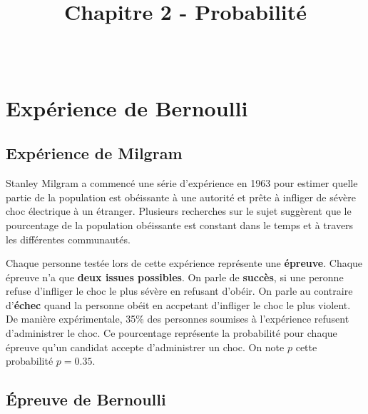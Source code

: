 \documentclass[paper=a4, fontsize=9pt]{scrartcl} %
\title{	
  \vspace{-10ex}
  \horrule{0.5pt} \\[0.4cm] %
  \huge Chapitre 2 - Probabilité\\ %
  \horrule{2pt} \\[0.5cm] %
}
\author{}
\date{\vspace{-10ex}} %
\begin{document}

\newtheorem{Definition}{Définition}
\newtheorem{Theorem}{Théorème}
\newtheorem{Proposition}{Propriété}

\renewcommand{\labelitemi}{$\bullet$}
\renewcommand{\labelitemii}{$\circ$}

\maketitle %
\setlength{\columnseprule}{1pt}

\section{Expérience de Bernoulli}

\subsection{Expérience de Milgram}

Stanley Milgram a commencé une série d'expérience en 1963 pour estimer quelle partie de la population est obéissante à une autorité et prête à infliger de sévère choc électrique à un étranger. Plusieurs recherches sur le sujet suggèrent que le pourcentage de la population obéissante est constant dans le temps et à travers les différentes communautés.

Chaque personne testée lors de cette expérience représente une \textbf{épreuve}. Chaque épreuve n'a que \textbf{deux issues possibles}. On parle de \textbf{succès}, si une peronne refuse d'infliger le choc le plus sévère en refusant d'obéir. On parle au contraire d'\textbf{échec} quand la personne obéit en accpetant d'infliger le choc le plus violent. De manière expérimentale, 35\% des personnes soumises à l'expérience refusent d'administrer le choc. Ce pourcentage représente la probabilité pour chaque épreuve qu'un candidat accepte d'administrer un choc. On note $p$ cette probabilité $p = 0.35$.

\subsection{Épreuve de Bernoulli}
\end{document}
